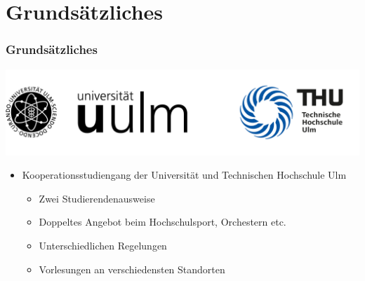 \documentclass[10pt,a4paper]{beamer}
\begin{document}
    \section{Grundsätzliches}
    \begin{frame}
        \frametitle{Grundsätzliches}
        \begin{center}
            \includegraphics[width=0.7\paperwidth]{Logos.png}
        \end{center}
        \vspace{0.3cm}
        \begin{itemize}
            \item Kooperationsstudiengang der Universität und Technischen Hochschule Ulm
            \begin{itemize}
                \setlength{\itemsep}{10pt} %
                \item Zwei Studierendenausweise
                \item Doppeltes Angebot beim Hochschulsport, Orchestern etc.
                \item Unterschiedlichen Regelungen
                \item Vorlesungen an verschiedensten Standorten
            \end{itemize}
        \end{itemize}
    \end{frame}

    \begin{frame}
        \begin{center}
        \end{center}
    \end{frame}
\end{document}
